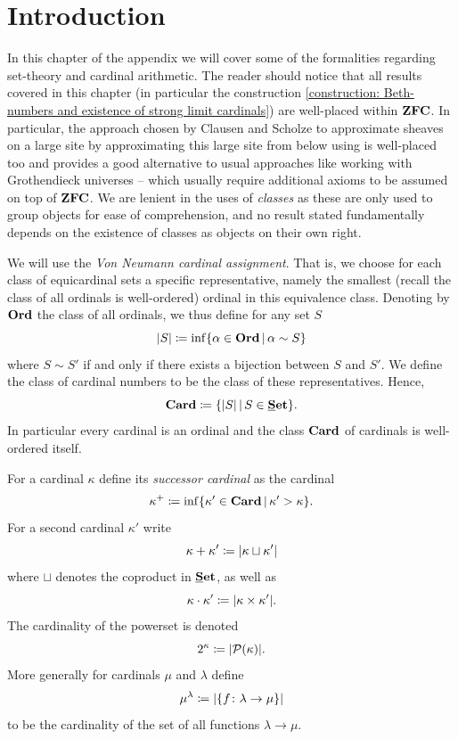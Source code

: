 
\section*{Introduction}
In this chapter of the appendix we will cover some of the formalities regarding set-theory and cardinal arithmetic. The reader should notice that all results covered in this chapter (in particular the construction \ref{construction: Beth-numbers and existence of strong limit cardinals}) are well-placed within ${\mathbf{ZFC}}$. In particular, the approach chosen by Clausen and Scholze to approximate sheaves on a large site by approximating this large site from below using  is well-placed too and provides a good alternative to usual approaches like working with Grothendieck universes -- which usually require additional axioms to be assumed on top of ${\mathbf{ZFC}}$. We are lenient in the uses of \emph{classes} as these are only used to group objects for ease of comprehension, and no result stated fundamentally depends on the existence of classes as objects on their own right.

\begin{convention}
	We will use the \emph{Von Neumann cardinal assignment}. That is, we choose for each class of equicardinal sets a specific representative, namely the smallest (recall the class of all ordinals is well-ordered) ordinal in this equivalence class. Denoting by ${{\mathbf{Ord}}}$ the class of all ordinals, we thus define for any set $S$
		$$\vert S\vert \coloneqq \inf\{\alpha \in {{\mathbf{Ord}}} \,\vert\, \alpha \sim S\}$$
	where $S\sim S'$ if and only if there exists a bijection between $S$ and $S'$. We define the class of cardinal numbers to be the class of these representatives. Hence,
		$${{\mathbf{Card}}} \coloneqq \{\vert S\vert \,\vert\, S \in {{\mathbf{\underline{S}et}}} \}.$$
	In particular every cardinal is an ordinal and the class ${{\mathbf{Card}}}$ of cardinals is well-ordered itself.
\end{convention}

\begin{definition}
	For a cardinal $\kappa$ define its \emph{successor cardinal} as the cardinal
		$$\kappa^+ \coloneqq \inf\{\kappa' \in {{\mathbf{Card}}} \,\vert\, \kappa' > \kappa\}.$$
	For a second cardinal $\kappa'$ write
		$$\kappa + \kappa' \coloneqq \vert \kappa \sqcup \kappa' \vert$$
	where $\sqcup$ denotes the coproduct in ${{\mathbf{\underline{S}et}}}$, as well as
		$$\kappa \cdot \kappa' \coloneqq \vert \kappa \times \kappa'\vert.$$
	The cardinality of the powerset is denoted
		$$2^\kappa \coloneqq \vert {\mathcal P(\kappa)}\vert.$$
	More generally for cardinals $\mu$ and $\lambda$ define
		$$\mu^\lambda \coloneqq \vert \{f\colon \lambda \to \mu\}\vert$$
	to be the cardinality of the set of all functions $\lambda\to \mu$.
\end{definition}

